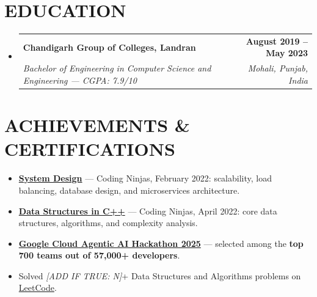 \documentclass[letterpaper,11pt]{article}
\makeatletter
\newcommand{\resumeItem}[1]{\item\small{{#1 \vspace{-2pt}}}}
\newcommand{\resumeSubheading}[4]{
  \vspace{-2pt}\item
    \begin{tabular*}{1.0\textwidth}[t]{l@{\extracolsep{\fill}}r}
      \textbf{\large#1} & \textbf{\small #2} \\
      \textit{\small#3} & \textit{\small #4} \\
    \end{tabular*}\vspace{-7pt}
}
\newcommand{\resumeSubHeadingListStart}{\begin{itemize}[leftmargin=0.0in, label={}]}
\newcommand{\resumeSubHeadingListEnd}{\end{itemize}}
\newcommand{\resumeItemListStart}{\begin{itemize}}
\newcommand{\resumeItemListEnd}{\end{itemize}\vspace{-5pt}}
\makeatother
\begin{document}
\section{EDUCATION}
  \resumeSubHeadingListStart
    \resumeSubheading
      {Chandigarh Group of Colleges, Landran}{August 2019 -- May 2023}
      {Bachelor of Engineering in Computer Science and Engineering — CGPA: 7.9/10}{Mohali, Punjab, India}
  \resumeSubHeadingListEnd

\vspace{-6pt}

\section{ACHIEVEMENTS \& CERTIFICATIONS}
    \vspace{2pt}
    \resumeItemListStart
        \resumeItem{\textbf{\href{http://ninjasfiles.s3.amazonaws.com/certificate18894980e4209379ac28665887f78da42bac5c2.pdf}{System Design}} — Coding Ninjas, February 2022: scalability, load balancing, database design, and microservices architecture.}
        \resumeItem{\textbf{\href{https://ninjasfiles.s3.amazonaws.com/certificate19853580c201378561a01f48ae87f59e9220db2.pdf}{Data Structures in C++}} — Coding Ninjas, April 2022: core data structures, algorithms, and complexity analysis.}
        \resumeItem{\textbf{\href{https://github.com/abhikumar002/Agentic-Gig-Project}{Google Cloud Agentic AI Hackathon 2025}} — selected among the \textbf{top 700 teams out of 57,000+ developers}.}
        \resumeItem{Solved \textit{[ADD IF TRUE: N]}+ Data Structures and Algorithms problems on \href{https://leetcode.com/u/sachinkumar6174/}{LeetCode}.}
    \resumeItemListEnd
\end{document}
